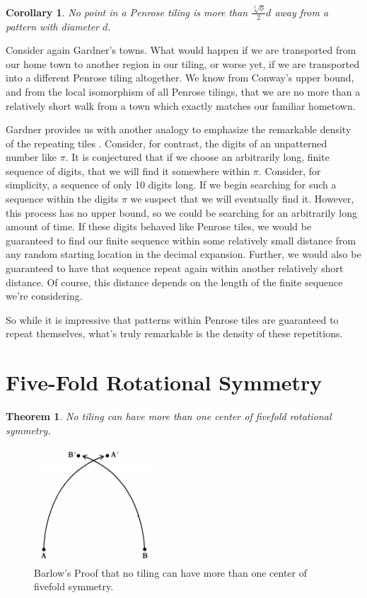\documentclass[
  oneside,
  11pt, a4paper,
  footinclude=true,
  headinclude=true,
  cleardoublepage=empty
]{scrbook}
\newtheorem{mythm}{Theorem}
\newtheorem{mycor}{Corollary}
\begin{document}
\begin{mycor}
No point in a Penrose tiling is more than $\frac{\sqrt[3]{\phi}}{2}d$ away from a pattern with diameter $d$.
\end{mycor}

Consider again Gardner's towns. What would happen if we are transported from our home town to another region in our tiling, or worse yet, if we are transported into a different Penrose tiling altogether. We know from Conway's upper bound, and from the local isomorphism of all Penrose tilings, that we are no more than a relatively short walk from a town which exactly matches our familiar hometown.

Gardner provides us with another analogy to emphasize the remarkable density of the repeating tiles  \cite{Gardner1997}. Consider, for contrast, the digits of an unpatterned number like $\pi$. It is conjectured that if we choose an arbitrarily long, finite sequence of digits, that we will find it somewhere within $\pi$. Consider, for simplicity, a sequence of only 10 digits long. If we begin searching for such a sequence within the digits $\pi$ we suspect that we will eventually find it. However, this process has no upper bound, so we could be searching for an arbitrarily long amount of time. If these digits behaved like Penrose tiles, we would be guaranteed to find our finite sequence within some relatively small distance from any random starting location in the decimal expansion. Further, we would also be guaranteed to have that sequence repeat again within another relatively short distance. Of course, this distance depends on the length of the finite sequence we're considering.

So while it is impressive that patterns within Penrose tiles are guaranteed to repeat themselves, what's truly remarkable is the density of these repetitions. 
\section{Five-Fold Rotational Symmetry} %
\begin{mythm}
No tiling can have more than one center of fivefold rotational symmetry.
\label{symthm}
\end{mythm}

\begin{figure}[H]
	\centering
	\includegraphics[width=0.4\textwidth]{proof}
    \caption[Proof of No Periodic Fivefold Symmetry]{Barlow's Proof that no tiling can have more than one center of fivefold symmetry. \cite{Gardner1997}}
    \label{fig:fivefoldproof}
\end{figure}
\end{document}

